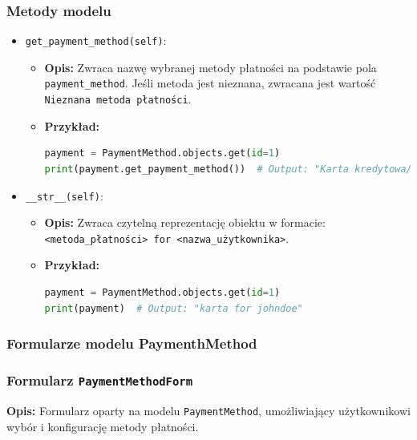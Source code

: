 \documentclass[12pt,a4paper,oneside]{article}
\theoremstyle{definition}
\numberwithin{equation}{section}
\begin{document}
\subsubsection{Metody modelu}
\begin{itemize}
    \item \texttt{get\_payment\_method(self)}:
    \begin{itemize}
        \item \textbf{Opis:} Zwraca nazwę wybranej metody płatności na podstawie pola \texttt{payment\_method}. Jeśli metoda jest nieznana, zwracana jest wartość \texttt{Nieznana metoda płatności}.
        \item \textbf{Przykład:}
        \begin{lstlisting}[language=Python]
payment = PaymentMethod.objects.get(id=1)
print(payment.get_payment_method())  # Output: "Karta kredytowa/debetowa"
        \end{lstlisting}
    \end{itemize}
    \item \texttt{\_\_str\_\_(self)}:
    \begin{itemize}
        \item \textbf{Opis:} Zwraca czytelną reprezentację obiektu w formacie: \texttt{<metoda\_płatności> for <nazwa\_użytkownika>}.
        \item \textbf{Przykład:}
        \begin{lstlisting}[language=Python]
payment = PaymentMethod.objects.get(id=1)
print(payment)  # Output: "karta for johndoe"
        \end{lstlisting}
    \end{itemize}
\end{itemize}

\subsubsection{Formularze modelu PaymenthMethod}

\subsubsection*{Formularz \texttt{PaymentMethodForm}}
\textbf{Opis:}  
Formularz oparty na modelu \texttt{PaymentMethod}, umożliwiający użytkownikowi wybór i konfigurację metody płatności.
\end{document}
